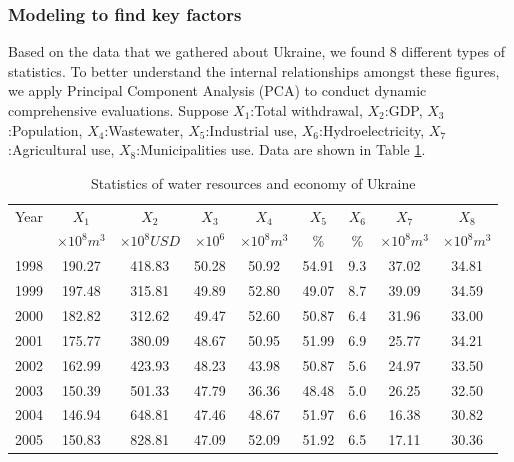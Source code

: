 \subsubsection{Modeling to find key factors}
Based on the data that we gathered about Ukraine, we found 8 different types of statistics. To better understand the internal relationships amongst these figures, we apply Principal Component Analysis (PCA)\cite{Lang Xu} to conduct dynamic comprehensive evaluations. Suppose $X_1$:Total withdrawal, $X_2$:GDP, $X_3$:Population, $X_4$:Wastewater, $X_5$:Industrial use, $X_6$:Hydroelectricity, $X_7$:Agricultural use, $X_8$:Municipalities use. Data are shown in Table \ref{Ukrainedata}.
\begin{table}[h]
\centering\caption{Statistics of water resources and economy of Ukraine}
\begin{tabular}{c|cccccccc}
  \hline
  Year & $X_1$ & $X_2$ & $X_3$ & $X_4$ & $X_5$ & $X_6$ & $X_7$ & $X_8$ \\
   & $\times 10^8 m^3$ & $\times 10^8 USD$ & $\times 10^6$ & $\times 10^8 m^3$ & \% & \% & $\times 10^8 m^3$ & $\times 10^8 m^3$ \\
   \hline
  1998 & 190.27 & 418.83 & 50.28 & 50.92 & 54.91 & 9.3 & 37.02 & 34.81  \\
  1999 & 197.48 & 315.81 & 49.89 & 52.80 & 49.07 & 8.7 & 39.09 & 34.59  \\
  2000 & 182.82 & 312.62 & 49.47 & 52.60 & 50.87 & 6.4 & 31.96 & 33.00  \\
  2001 & 175.77 & 380.09 & 48.67 & 50.95 & 51.99 & 6.9 & 25.77 & 34.21  \\
  2002 & 162.99 & 423.93 & 48.23 & 43.98 & 50.87 & 5.6 & 24.97 & 33.50  \\
  2003 & 150.39 & 501.33 & 47.79 & 36.36 & 48.48 & 5.0 & 26.25 & 32.50  \\
  2004 & 146.94 & 648.81 & 47.46 & 48.67 & 51.97 & 6.6 & 16.38 & 30.82  \\
  2005 & 150.83 & 828.81 & 47.09 & 52.09 & 51.92 & 6.5 & 17.11 & 30.36  \\
  \hline
\end{tabular}\label{Ukrainedata}
\end{table}

